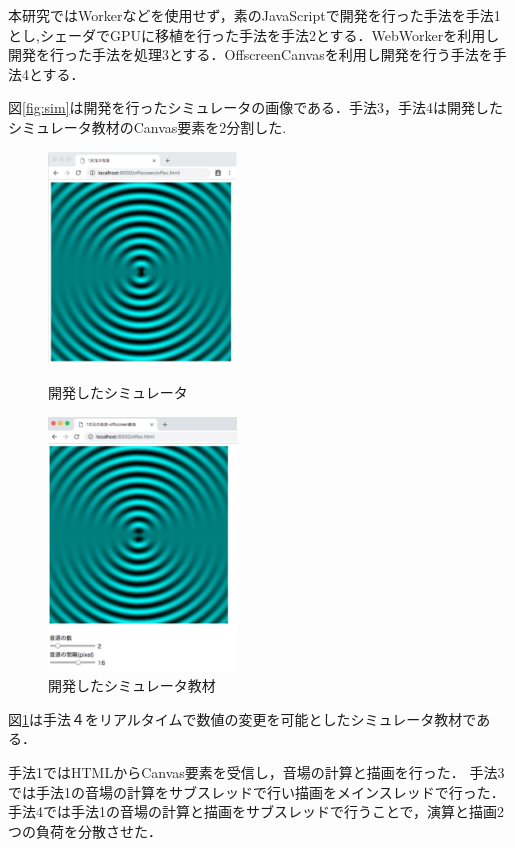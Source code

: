 \documentclass[a4j,12pt]{jsarticle}
\begin{document}
本研究ではWorkerなどを使用せず，素のJavaScriptで開発を行った手法を手法1とし,シェーダでGPUに移植を行った手法を手法2とする．WebWorkerを利用し開発を行った手法を処理3とする．OffscreenCanvasを利用し開発を行う手法を手法4とする．

図\ref{fig:sim}は開発を行ったシミュレータの画像である．手法3，手法4は開発したシミュレータ教材のCanvas要素を2分割した.

\begin{figure}[htbp]
 \begin{minipage}{0.5\hsize}
  \begin{center}
   \includegraphics[width=50mm]{sim.pdf}
  \end{center}
  \caption{開発したシミュレータ}
  \label{fig:sim}
 \end{minipage}
 \begin{minipage}{0.5\hsize}
  \begin{center}
   \includegraphics[width=50mm]{kYouzai.pdf}
  \end{center}
  \caption{開発したシミュレータ教材}
  \label{fig:sim2}
 \end{minipage}
\end{figure}

図\ref{fig:sim2}は手法４をリアルタイムで数値の変更を可能としたシミュレータ教材である．

手法1ではHTMLからCanvas要素を受信し，音場の計算と描画を行った．
手法3では手法1の音場の計算をサブスレッドで行い描画をメインスレッドで行った．
手法4では手法1の音場の計算と描画をサブスレッドで行うことで，演算と描画2つの負荷を分散させた．
\end{document}
